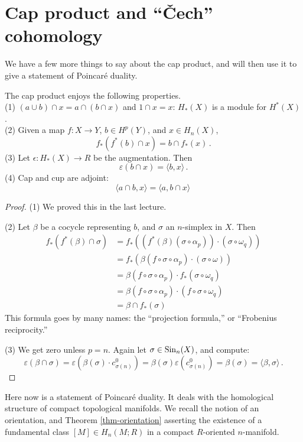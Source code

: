\section{Cap product and ``\v{C}ech'' cohomology}

We have a few more things to say about the cap product, and will then use it
to give a statement of Poincar\'e duality. 

\begin{prop}
The cap product enjoys the following properties.\\
(1) $(a\cup b)\cap x=a\cap(b\cap x)$ and $1\cap x=x$: $H_*(X)$ is a module for
$H^*(X)$.\\
(2) Given a map $f:X\to Y$, $b\in H^p(Y)$, and $x\in H_n(X)$, 
\[
f_*(f^*(b)\cap x)=b\cap f_*(x)\,.
\]
(3) Let $\epsilon:H_*(X)\to R$ be the augmentation. Then 
\[
\varepsilon(b\cap x)=\langle b,x\rangle\,.
\]
(4) Cap and cup are adjoint:
\[
\langle a\cap b,x\rangle=\langle a,b\cap x\rangle\,
\]
\end{prop}
\begin{proof}
(1) We proved this in the last lecture.

\noindent
(2) Let $\beta$ be a cocycle representing $b$, and $\sigma$ an $n$-simplex
in $X$. Then
\begin{align*}
f_\ast(f^\ast(\beta)\cap\sigma)& =f_\ast(\left(f^\ast(\beta)(\sigma\circ\alpha_p)\right)\cdot(\sigma\circ\omega_q))\\
& =f_\ast(\beta(f\circ\sigma\circ\alpha_p)\cdot(\sigma\circ\omega))\\
& =\beta(f\circ\sigma\circ\alpha_p)\cdot f_\ast(\sigma\circ\omega_q)\\
& = \beta(f\circ\sigma\circ\alpha_p)\cdot(f\circ\sigma\circ\omega_q)\\
& = \beta\cap f_\ast(\sigma)
\end{align*}
This formula goes by many names: the ``projection formula,'' or ``Frobenius
reciprocity.'' 

\noindent
(3) We get zero unless $p=n$. Again let $\sigma\in\mathrm{Sin}_n(X)$, and compute:
\[
\varepsilon(\beta\cap\sigma)=\varepsilon(\beta(\sigma)\cdot c^0_{\sigma(n)})=\beta(\sigma)\varepsilon(c^0_{\sigma(n)})=\beta(\sigma)=\langle \beta,\sigma\rangle
\,.
\]
\end{proof}

Here now is a statement of Poincar\'e duality. It deals with the 
homological structure of compact topological manifolds. We recall the
notion of an orientation, and Theorem \ref{thm-orientation} asserting
the existence of a fundamental class $[M]\in H_n(M;R)$ in a compact
$R$-oriented $n$-manifold.

